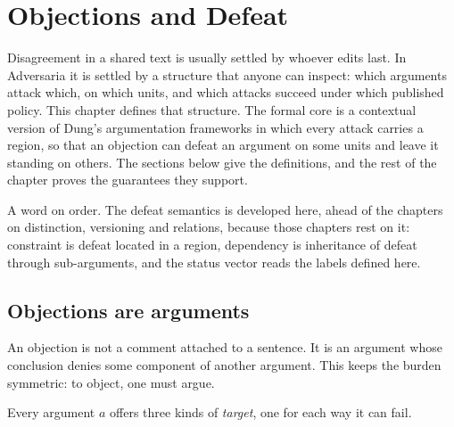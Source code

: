 \chapter{Objections and Defeat}\label{ch:objection}

Disagreement in a shared text is usually settled by whoever edits last. In Adversaria it is settled by a structure that anyone can inspect: which arguments attack which, on which units, and which attacks succeed under which published policy. This chapter defines that structure. The formal core is a contextual version of Dung's argumentation frameworks in which every attack carries a region, so that an objection can defeat an argument on some units and leave it standing on others. The sections below give the definitions, and the rest of the chapter proves the guarantees they support.

A word on order. The defeat semantics is developed here, ahead of the chapters on distinction, versioning and relations, because those chapters rest on it: constraint is defeat located in a region, dependency is inheritance of defeat through sub-arguments, and the status vector reads the labels defined here.

\section{Objections are arguments}

An objection is not a comment attached to a sentence. It is an argument whose conclusion denies some component of another argument. This keeps the burden symmetric: to object, one must argue.

Every argument $a$ offers three kinds of \emph{target}, one for each way it can fail.

